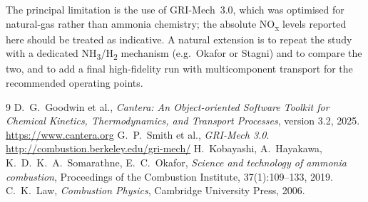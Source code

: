 \documentclass[12pt,a4paper]{article}
\newcommand{\NHH}{NH\textsubscript{3}}
\newcommand{\HH}{H\textsubscript{2}}
\newcommand{\NOx}{NO\textsubscript{x}}
\begin{document}
The principal limitation is the use of GRI-Mech~3.0, which was optimised for
natural-gas rather than ammonia chemistry; the absolute \NOx{} levels reported
here should be treated as indicative. A natural extension is to repeat the study
with a dedicated \NHH{}/\HH{} mechanism (e.g.\ Okafor or Stagni) and to compare
the two, and to add a final high-fidelity run with multicomponent transport for
the recommended operating points.

\begin{thebibliography}{9}
 D.~G.~Goodwin et al., \emph{Cantera: An Object-oriented
Software Toolkit for Chemical Kinetics, Thermodynamics, and Transport
Processes}, version 3.2, 2025. \url{https://www.cantera.org}
 G.~P.~Smith et al., \emph{GRI-Mech 3.0}.
\url{http://combustion.berkeley.edu/gri-mech/}
 H.~Kobayashi, A.~Hayakawa, K.~D.~K.~A.~Somarathne,
E.~C.~Okafor, \emph{Science and technology of ammonia combustion},
Proceedings of the Combustion Institute, 37(1):109--133, 2019.
 C.~K.~Law, \emph{Combustion Physics}, Cambridge University Press,
2006.
\end{thebibliography}
\end{document}
